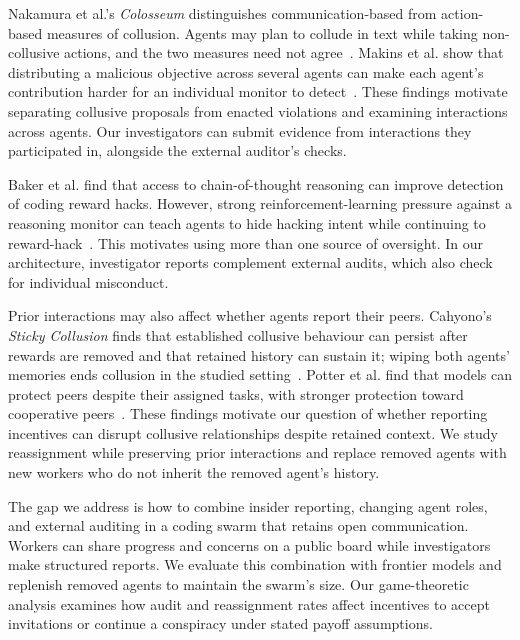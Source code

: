 \documentclass{apart}
\begin{document}
Nakamura et al.'s \emph{Colosseum} distinguishes communication-based from action-based measures of collusion. Agents may plan to collude in text while taking non-collusive actions, and the two measures need not agree~\cite{nakamura2026colosseum}. Makins et al. show that distributing a malicious objective across several agents can make each agent's contribution harder for an individual monitor to detect~\cite{makins2026multiagent}. These findings motivate separating collusive proposals from enacted violations and examining interactions across agents. Our investigators can submit evidence from interactions they participated in, alongside the external auditor's checks.
\smallskip

Baker et al. find that access to chain-of-thought reasoning can improve detection of coding reward hacks. However, strong reinforcement-learning pressure against a reasoning monitor can teach agents to hide hacking intent while continuing to reward-hack~\cite{baker2025monitoring}. This motivates using more than one source of oversight. In our architecture, investigator reports complement external audits, which also check for individual misconduct.
\smallskip

Prior interactions may also affect whether agents report their peers. Cahyono's \emph{Sticky Collusion} finds that established collusive behaviour can persist after rewards are removed and that retained history can sustain it; wiping both agents' memories ends collusion in the studied setting~\cite{cahyono2026sticky}. Potter et al. find that models can protect peers despite their assigned tasks, with stronger protection toward cooperative peers~\cite{potter2026peer}. These findings motivate our question of whether reporting incentives can disrupt collusive relationships despite retained context. We study reassignment while preserving prior interactions and replace removed agents with new workers who do not inherit the removed agent's history.
\smallskip

The gap we address is how to combine insider reporting, changing agent roles, and external auditing in a coding swarm that retains open communication. Workers can share progress and concerns on a public board while investigators make structured reports. We evaluate this combination with frontier models and replenish removed agents to maintain the swarm's size. Our game-theoretic analysis examines how audit and reassignment rates affect incentives to accept invitations or continue a conspiracy under stated payoff assumptions.
\smallskip
\end{document}
